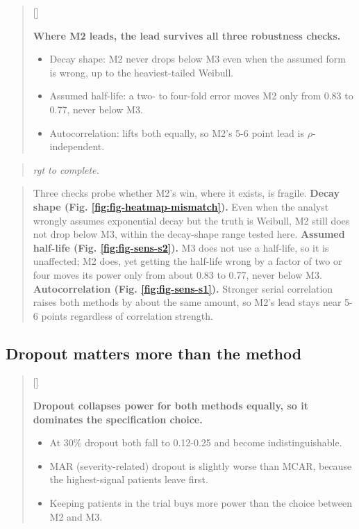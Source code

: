 \documentclass[
  11pt,
]{article}
\newcounter{pgraph}
\newenvironment{bullets}{%
  \stepcounter{pgraph}%
  \begin{quote}\small\sffamily\color[gray]{0.30}%
  {\normalfont\scriptsize\color[gray]{0.58}[\thepgraph]\enspace}}{%
  \end{quote}}
\newenvironment{rgt}{%
  \begin{quote}\small\itshape\color[RGB]{20,60,160}}{%
  \end{quote}}
\newenvironment{orig}{%
  \begin{quote}\normalsize\color[gray]{0.55}}{%
  \end{quote}}
\begin{document}
\begin{bullets}

\textbf{Where M2 leads, the lead survives all three robustness
checks.}

\begin{itemize}\setlength{\itemsep}{2pt}\setlength{\parskip}{0pt}
\item Decay shape: M2 never drops below M3 even when the assumed
form is wrong, up to the heaviest-tailed Weibull.
\item Assumed half-life: a two- to four-fold error moves M2 only
from 0.83 to 0.77, never below M3.
\item Autocorrelation: lifts both equally, so M2's 5-6 point lead is
$\rho$-independent.
\end{itemize}

\end{bullets}

\begin{rgt}
rgt to complete.

\end{rgt}

\begin{orig}
Three checks probe whether M2's win, where it exists, is fragile.
\textbf{Decay shape (Fig. \ref{fig:fig-heatmap-mismatch}).} Even when the
analyst wrongly assumes exponential decay but the truth is Weibull,
M2 still does not drop below M3, within the decay-shape range tested
here. \textbf{Assumed half-life (Fig. \ref{fig:fig-sens-s2}).} M3 does
not use a half-life, so it is unaffected; M2 does, yet getting the
half-life wrong by a factor of two or four moves its power only from
about 0.83 to 0.77, never below M3. \textbf{Autocorrelation
(Fig. \ref{fig:fig-sens-s1}).} Stronger serial correlation raises
both methods by about the same amount, so M2's lead stays near 5-6
points regardless of correlation strength.

\end{orig}

\subsection{Dropout matters more than the method}\label{dropout-matters-more-than-the-method}

\begin{bullets}

\textbf{Dropout collapses power for both methods equally, so it
dominates the specification choice.}

\begin{itemize}\setlength{\itemsep}{2pt}\setlength{\parskip}{0pt}
\item At 30\% dropout both fall to 0.12-0.25 and become
indistinguishable.
\item MAR (severity-related) dropout is slightly worse than MCAR,
because the highest-signal patients leave first.
\item Keeping patients in the trial buys more power than the choice
between M2 and M3.
\end{itemize}

\end{bullets}
\end{document}
